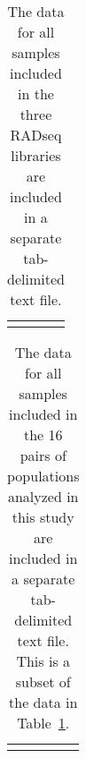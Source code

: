 \begin{table}[htbp]
\sffamily
\captionsetup{name=Table S, labelformat=noSpace}
\caption{
    The data for all samples included in the three RADseq libraries are
    included in a separate tab-delimited text file.
}
\centering
\begin{tabular}{ l l }
     &  \\
\end{tabular}
\label{table:reftosampledata}
\end{table}

\begin{table}[htbp]
\sffamily
\captionsetup{name=Table S, labelformat=noSpace}
\caption{
    The data for all samples included in the 16 pairs of populations analyzed
    in this study are included in a separate tab-delimited text file.
    This is a subset of the data in Table~\ref{table:reftosampledata}.
}
\centering
\begin{tabular}{ l l }
     &  \\
\end{tabular}
\label{table:reftopairsampledata}
\end{table}



